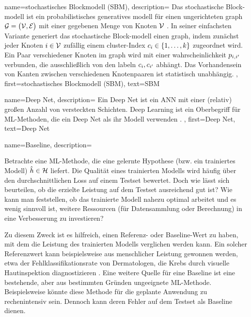 {{{{
{
	name={stochastisches Blockmodell (SBM)},
	description={
		Das stochastische Block-\gls{modell} ist ein probabilistisches generatives \gls{modell} für einen ungerichteten \gls{graph} $\mathcal{G} = \big( \mathcal{V}, \mathcal{E} \big)$ 
		mit einer gegebenen Menge von Knoten $\mathcal{V}$ \cite{AbbeSBM2018}. In seiner einfachsten Variante 
		generiert das stochastische Block-\gls{modell} einen \gls{graph}, indem zunächst jeder Knoten $i \in \mathcal{V}$ 
		zufällig einem \gls{cluster}-Index $c_{i} \in \{1,\ldots,k\}$ zugeordnet wird. 
		Ein Paar verschiedener Knoten im \gls{graph} wird mit einer \gls{wahrscheinlichkeit} $p_{i,i'}$ verbunden, 
		die ausschließlich von den \gls{label}n $c_{i}, c_{i'}$ abhängt. 
		Das Vorhandensein von Kanten zwischen verschiedenen Knotenpaaren ist statistisch unabhängig.
	},
	first={stochastisches Blockmodell (SBM)},
	text={SBM}
}

{
	name={Deep Net},
	description={
		Ein Deep Net ist ein \gls{ANN} mit einer (relativ) großen Anzahl von 
		versteckten Schichten. Deep Learning ist ein Oberbegriff für \gls{ML}-Methoden, die ein Deep Net als ihr \gls{Modell} verwenden \cite{Goodfellow-et-al-2016}.
	},
	first={Deep Net},
	text={Deep Net}
}


{
	name={Baseline},
	description={
		Betrachte eine \gls{ML}-Methode, die eine gelernte \gls{Hypothese} (bzw. ein trainiertes \gls{Modell}) $\hat{h} \in \mathcal{H}$ liefert. Die Qualität eines trainierten \gls{Modells} wird häufig über den durchschnittlichen \gls{Loss} auf einem \gls{Testset} bewertet. Doch wie lässt sich beurteilen, ob die erzielte Leistung auf dem \gls{Testset} ausreichend gut ist? Wie kann man feststellen, ob das trainierte \gls{Modell} nahezu optimal arbeitet und es wenig sinnvoll ist, weitere Ressourcen (für \gls{Daten}sammlung oder Berechnung) in eine Verbesserung zu investieren? 
		
		Zu diesem Zweck ist es hilfreich, einen Referenz- oder Baseline-Wert zu haben, mit dem die Leistung des trainierten \gls{Modells} verglichen werden kann. Ein solcher Referenzwert kann beispielsweise aus menschlicher Leistung gewonnen werden, etwa der Fehlklassifikationsrate von Dermatologen, die Krebs durch visuelle Hautinspektion diagnostizieren \cite{SkinHumanAI}. Eine weitere Quelle für eine Baseline ist eine bestehende, aber aus bestimmten Gründen ungeeignete \gls{ML}-Methode. Beispielsweise könnte diese Methode für die geplante Anwendung zu rechenintensiv sein. Dennoch kann deren Fehler auf dem \gls{Testset} als Baseline dienen.
		
}}}}}}

